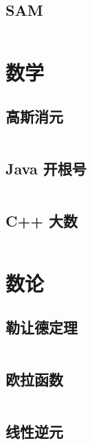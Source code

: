 \documentclass[titlepage,landscape,a4paper,10pt]{article}
\begin{document}
\begin{multicols}{2}
\begin{spacing}{0.8}
\subsection{SAM}
\inputminted{cpp}{Strings/SAM.cpp}

\section{数学}

\subsection{高斯消元}
\inputminted{cpp}{Math/高斯消元.cpp}

\subsection{Java 开根号}
\inputminted{java}{Math/Java开根号.java}

\subsection{C++ 大数}
\inputminted{cpp}{Math/C++大数.cpp}

\section{数论}

\subsection{勒让德定理}
\inputminted{cpp}{NumberTheory/Legendre.cpp}

\subsection{欧拉函数}
\inputminted{cpp}{NumberTheory/欧拉函数.cpp}

\subsection{线性逆元}



\end{spacing}
\end{multicols}
\end{document}
